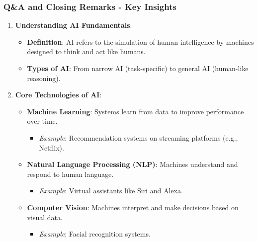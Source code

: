 \documentclass{beamer}
\begin{document}
\begin{frame}[fragile]
    \frametitle{Q\&A and Closing Remarks - Key Insights}
    \begin{enumerate}
        \item \textbf{Understanding AI Fundamentals}:
        \begin{itemize}
            \item \textbf{Definition}: AI refers to the simulation of human intelligence by machines designed to think and act like humans.
            \item \textbf{Types of AI}: From narrow AI (task-specific) to general AI (human-like reasoning).
        \end{itemize}

        \item \textbf{Core Technologies of AI}:
        \begin{itemize}
            \item \textbf{Machine Learning}: Systems learn from data to improve performance over time.
            \begin{itemize}
                \item \textit{Example}: Recommendation systems on streaming platforms (e.g., Netflix).
            \end{itemize}
            \item \textbf{Natural Language Processing (NLP)}: Machines understand and respond to human language.
            \begin{itemize}
                \item \textit{Example}: Virtual assistants like Siri and Alexa.
            \end{itemize}
            \item \textbf{Computer Vision}: Machines interpret and make decisions based on visual data.
            \begin{itemize}
                \item \textit{Example}: Facial recognition systems.
            \end{itemize}
        \end{itemize}
    \end{enumerate}
\end{frame}
\end{document}
